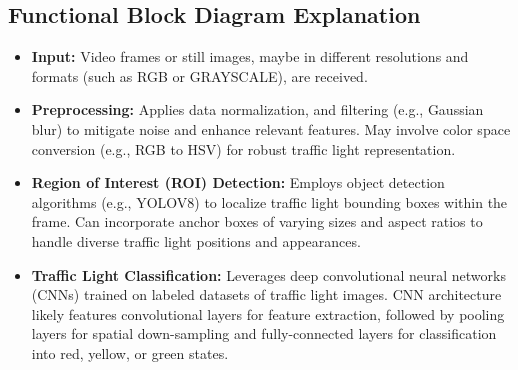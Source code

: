 \documentclass[12 pt]{report}
\begin{document}
\subsection{Functional Block Diagram Explanation}
{
  \begin{justify}
  \begin{itemize}
    \item \textbf{Input:} Video frames or still images, maybe in different resolutions and formats (such as RGB or GRAYSCALE), are received.

    \item \textbf{Preprocessing:} Applies data normalization, and filtering (e.g., Gaussian blur) to mitigate noise and enhance relevant features. May involve color space conversion (e.g., RGB to HSV) for robust traffic light representation.

    \item \textbf{Region of Interest (ROI) Detection:} Employs object detection algorithms (e.g., YOLOV8) to localize traffic light bounding boxes within the frame. Can incorporate anchor boxes of varying sizes and aspect ratios to handle diverse traffic light positions and appearances.

    \item \textbf{Traffic Light Classification:} Leverages deep convolutional neural networks (CNNs) trained on labeled datasets of traffic light images. CNN architecture likely features convolutional layers for feature extraction, followed by pooling layers for spatial down-sampling and fully-connected layers for classification into red, yellow, or green states.
  \end{itemize}
  \end{justify}
}
\end{document}
